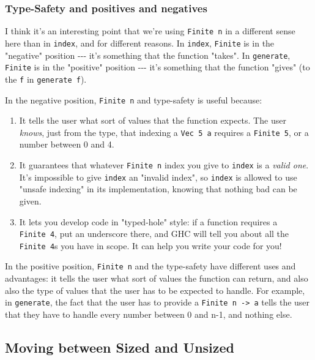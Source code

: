\documentclass[]{article}
\begin{document}
\subsubsection{Type-Safety and positives and negatives}

I think it's an interesting point that we're using \texttt{Finite\ n} in a
different sense here than in \texttt{index}, and for different reasons. In
\texttt{index}, \texttt{Finite} is in the "negative" position -\/-\/- it's
something that the function "takes". In \texttt{generate}, \texttt{Finite} is in
the "positive" position -\/-\/- it's something that the function "gives" (to the
\texttt{f} in \texttt{generate\ f}).

In the negative position, \texttt{Finite\ n} and type-safety is useful because:

\begin{enumerate}
\tightlist
\item
  It tells the user what sort of values that the function expects. The user
  \emph{knows}, just from the type, that indexing a \texttt{Vec\ 5\ a} requires
  a \texttt{Finite\ 5}, or a number between 0 and 4.
\item
  It guarantees that whatever \texttt{Finite\ n} index you give to
  \texttt{index} is a \emph{valid one}. It's impossible to give \texttt{index}
  an "invalid index", so \texttt{index} is allowed to use "unsafe indexing" in
  its implementation, knowing that nothing bad can be given.
\item
  It lets you develop code in "typed-hole" style: if a function requires a
  \texttt{Finite\ 4}, put an underscore there, and GHC will tell you about all
  the \texttt{Finite\ 4}s you have in scope. It can help you write your code for
  you!
\end{enumerate}

In the positive position, \texttt{Finite\ n} and the type-safety have different
uses and advantages: it tells the user what sort of values the function can
return, and also also the type of values that the user has to be expected to
handle. For example, in \texttt{generate}, the fact that the user has to provide
a \texttt{Finite\ n\ -\textgreater{}\ a} tells the user that they have to handle
every number between 0 and n-1, and nothing else.

\subsection{Moving between Sized and Unsized}
\end{document}
